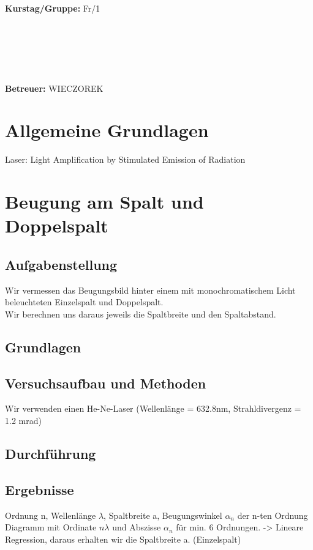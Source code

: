 \documentclass{article}
\begin{document}
\begin{verbatim}


\end{verbatim}
			\begin{flushleft}
			\textbf{\Large{Kurstag/Gruppe:}} \Large{Fr/1}
			\end{flushleft}

\begin{verbatim}






\end{verbatim}
			\begin{flushleft}
			\LARGE{\textbf{Betreuer:}}	\Large{WIECZOREK}	
			\end{flushleft}
\newpage	

\section{Allgemeine Grundlagen}
Laser: Light Amplification by Stimulated Emission of Radiation

\section{Beugung am Spalt und Doppelspalt}

\subsection{Aufgabenstellung}
Wir vermessen das Beugungsbild hinter einem mit monochromatischem Licht  beleuchteten Einzelspalt und Doppelspalt. \\
Wir berechnen uns daraus jeweils die Spaltbreite und den Spaltabstand.
\subsection{Grundlagen}
\subsection{Versuchsaufbau und Methoden}
Wir verwenden einen He-Ne-Laser (Wellenlänge = 632.8nm, Strahldivergenz = 1.2 mrad)
\subsection{Durchführung}
\subsection{Ergebnisse}
Ordnung n, Wellenlänge $\lambda$, Spaltbreite a, Beugungswinkel $\alpha_n$ der n-ten Ordnung\\
Diagramm mit Ordinate $n\lambda$ und Abszisse $\alpha_n$ für min. 6 Ordnungen. -> Lineare Regression, daraus erhalten wir die Spaltbreite a. (Einzelspalt)
\end{document}
